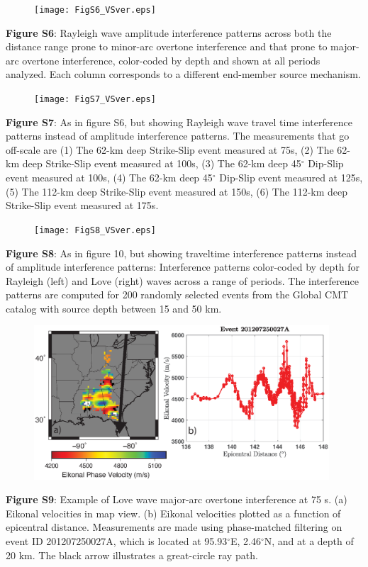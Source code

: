 \documentclass[extra,mreferee]{gji}
\begin{document}
\newpage
\begin{figure}
 \noindent\texttt{[image: FigS6\_VSver.eps]}
\end{figure}
\textbf{Figure S6}: Rayleigh wave amplitude interference patterns across both the distance range prone to minor-arc overtone interference and that prone to major-arc overtone interference, color-coded by depth and shown at all periods analyzed. Each column corresponds to a different end-member source mechanism.

\newpage
\begin{figure}
 \noindent\texttt{[image: FigS7\_VSver.eps]}
\end{figure}
\textbf{Figure S7}: As in figure S6, but showing Rayleigh wave travel time interference patterns instead of amplitude interference patterns. The measurements that go off-scale are (1) The 62-km deep Strike-Slip event measured at 75s, (2) The 62-km deep Strike-Slip event measured at 100s, (3) The 62-km deep 45$^\circ$ Dip-Slip event measured at 100s, (4) The 62-km deep 45$^\circ$ Dip-Slip event measured at 125s, (5) The 112-km deep Strike-Slip event measured at 150s, (6) The 112-km deep Strike-Slip event measured at 175s. 

\newpage
\begin{figure}
 \noindent\texttt{[image: FigS8\_VSver.eps]}
\end{figure}
\textbf{Figure S8}: As in figure 10, but showing traveltime interference patterns instead of amplitude interference patterns: Interference patterns color-coded by depth for Rayleigh (left) and Love (right) waves across a range of periods. The interference patterns are computed for 200 randomly selected events from the Global CMT catalog with source depth between 15 and 50 km.

\newpage
\begin{figure}
\noindent\includegraphics[width=0.98\textwidth]{FigS9_VSver.eps}
\end{figure}
\textbf{Figure S9}: Example of Love wave major-arc overtone interference at 75 s. (a) Eikonal velocities in map view. (b) Eikonal velocities plotted as a function of epicentral distance. Measurements are made using phase-matched filtering on event ID 201207250027A, which is located at 95.93$^\circ$E, 2.46$^\circ$N, and at a depth of 20 km. The black arrow illustrates a great-circle ray path.
\end{document}
